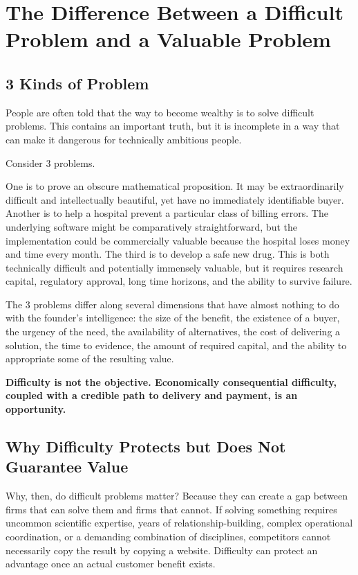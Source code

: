 \section{The Difference Between a Difficult Problem and a Valuable Problem}

\subsection{3 Kinds of Problem}

People are often told that the way to become wealthy is to solve difficult problems. This contains an important truth, but it is incomplete in a way that can make it dangerous for technically ambitious people.

Consider 3 problems.

One is to prove an obscure mathematical proposition. It may be extraordinarily difficult and intellectually beautiful, yet have no immediately identifiable buyer. Another is to help a hospital prevent a particular class of billing errors. The underlying software might be comparatively straightforward, but the implementation could be commercially valuable because the hospital loses money and time every month. The third is to develop a safe new drug. This is both technically difficult and potentially immensely valuable, but it requires research capital, regulatory approval, long time horizons, and the ability to survive failure.

The 3 problems differ along several dimensions that have almost nothing to do with the founder's intelligence: the size of the benefit, the existence of a buyer, the urgency of the need, the availability of alternatives, the cost of delivering a solution, the time to evidence, the amount of required capital, and the ability to appropriate some of the resulting value.

\textbf{Difficulty is not the objective. Economically consequential difficulty, coupled with a credible path to delivery and payment, is an opportunity.}

\subsection{Why Difficulty Protects but Does Not Guarantee Value}

Why, then, do difficult problems matter? Because they can create a gap between firms that can solve them and firms that cannot. If solving something requires uncommon scientific expertise, years of relationship-building, complex operational coordination, or a demanding combination of disciplines, competitors cannot necessarily copy the result by copying a website. Difficulty can protect an advantage once an actual customer benefit exists.

